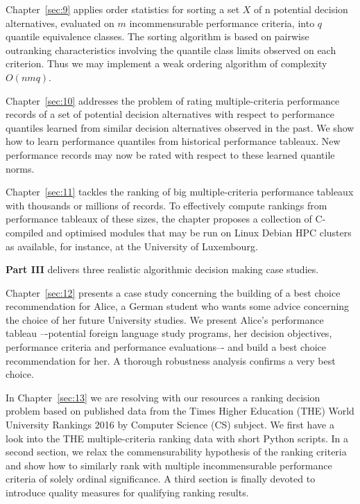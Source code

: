 Chapter~\ref{sec:9} applies order statistics for sorting a set $X$ of n potential decision alternatives, evaluated on $m$ incommensurable performance criteria, into $q$ quantile equivalence classes. The sorting algorithm is based on pairwise outranking characteristics involving the quantile class limits observed on each criterion. Thus we may implement a weak ordering algorithm of complexity $O(nmq)$.

Chapter~\ref{sec:10} addresses the problem of rating multiple-criteria performance records of a set of potential decision alternatives with respect to performance quantiles learned from similar decision alternatives observed in the past. We show how to learn performance quantiles from historical performance tableaux. New performance records may now be rated with respect to these learned quantile norms.

Chapter~\ref{sec:11} tackles the ranking of big multiple-criteria performance tableaux with thousands or millions of records. To effectively compute rankings from performance tableaux of these sizes, the chapter proposes a collection of C-compiled and optimised modules that may be run on Linux Debian HPC clusters as available, for instance, at the University of Luxembourg.
\vspace{5pt}

\textbf{Part III} delivers three realistic algorithmic decision making case studies.

Chapter~\ref{sec:12} presents a case study concerning the building of a best choice recommendation for Alice, a German student who wants some advice concerning the choice of her future University studies. We present Alice’s performance tableau –-potential foreign language study programs, her decision objectives, performance criteria and performance evaluations–- and build a best choice recommendation for her. A thorough robustness analysis confirms a very best choice.

In Chapter~\ref{sec:13} we are resolving with our \Digraph resources a ranking decision problem based on published data from the Times Higher Education (THE) World University Rankings 2016 by Computer Science (CS) subject. We first have a look into the THE multiple-criteria ranking data with short Python scripts. In a second section, we relax the commensurability hypothesis of the ranking criteria and show how to similarly rank with multiple incommensurable performance criteria of solely ordinal significance. A third section is finally devoted to introduce quality measures for qualifying ranking results.

